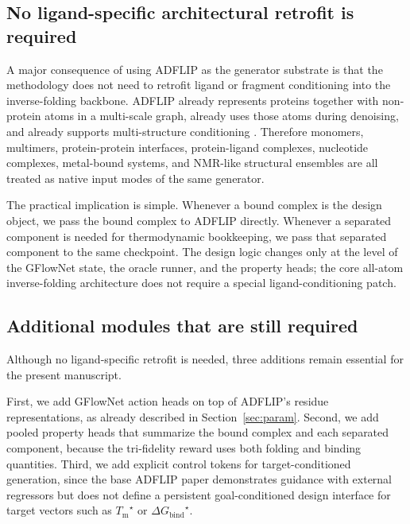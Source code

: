 \documentclass[11pt]{article}
\newcommand{\Tm}{\ensuremath{T_{\mathrm m}}}
\newcommand{\DGbind}{\ensuremath{\Delta G_{\mathrm{bind}}}}
\begin{document}
	\subsection{No ligand-specific architectural retrofit is required}
	
	A major consequence of using ADFLIP as the generator substrate is that the methodology does not need to retrofit ligand or fragment conditioning into the inverse-folding backbone. ADFLIP already represents proteins together with non-protein atoms in a multi-scale graph, already uses those atoms during denoising, and already supports multi-structure conditioning \citep{yi2025adflip}. Therefore monomers, multimers, protein-protein interfaces, protein-ligand complexes, nucleotide complexes, metal-bound systems, and NMR-like structural ensembles are all treated as native input modes of the same generator.
	
	The practical implication is simple. Whenever a bound complex is the design object, we pass the bound complex to ADFLIP directly. Whenever a separated component is needed for thermodynamic bookkeeping, we pass that separated component to the same checkpoint. The design logic changes only at the level of the GFlowNet state, the oracle runner, and the property heads; the core all-atom inverse-folding architecture does not require a special ligand-conditioning patch.
	
	\subsection{Additional modules that are still required}
	
	Although no ligand-specific retrofit is needed, three additions remain essential for the present manuscript.
	
	First, we add GFlowNet action heads on top of ADFLIP's residue representations, as already described in Section~\ref{sec:param}. Second, we add pooled property heads that summarize the bound complex and each separated component, because the tri-fidelity reward uses both folding and binding quantities. Third, we add explicit control tokens for target-conditioned generation, since the base ADFLIP paper demonstrates guidance with external regressors but does not define a persistent goal-conditioned design interface for target vectors such as $\Tm^\star$ or $\DGbind^\star$.
	
\end{document}
